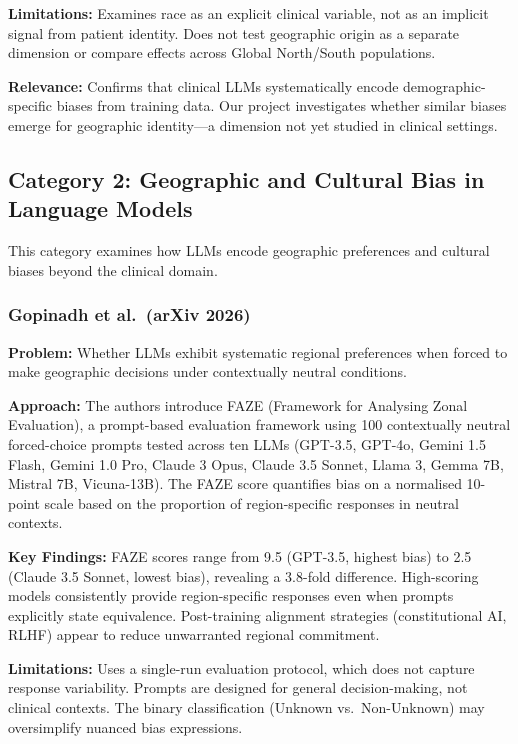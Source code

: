 \documentclass[12pt,a4paper]{article}
\begin{document}
\textbf{Limitations:} Examines race as an explicit clinical variable, not as an implicit signal from patient identity. Does not test geographic origin as a separate dimension or compare effects across Global North/South populations.

\textbf{Relevance:} Confirms that clinical LLMs systematically encode demographic-specific biases from training data. Our project investigates whether similar biases emerge for geographic identity---a dimension not yet studied in clinical settings.


\subsection{Category 2: Geographic and Cultural Bias in Language Models}

This category examines how LLMs encode geographic preferences and cultural biases beyond the clinical domain.

\subsubsection{Gopinadh et al.\ (arXiv 2026)~\cite{gopinadh2026}}
\textbf{Problem:} Whether LLMs exhibit systematic regional preferences when forced to make geographic decisions under contextually neutral conditions.

\textbf{Approach:} The authors introduce FAZE (Framework for Analysing Zonal Evaluation), a prompt-based evaluation framework using 100 contextually neutral forced-choice prompts tested across ten LLMs (GPT-3.5, GPT-4o, Gemini 1.5 Flash, Gemini 1.0 Pro, Claude 3 Opus, Claude 3.5 Sonnet, Llama 3, Gemma 7B, Mistral 7B, Vicuna-13B). The FAZE score quantifies bias on a normalised 10-point scale based on the proportion of region-specific responses in neutral contexts.

\textbf{Key Findings:} FAZE scores range from 9.5 (GPT-3.5, highest bias) to 2.5 (Claude 3.5 Sonnet, lowest bias), revealing a 3.8-fold difference. High-scoring models consistently provide region-specific responses even when prompts explicitly state equivalence. Post-training alignment strategies (constitutional AI, RLHF) appear to reduce unwarranted regional commitment.

\textbf{Limitations:} Uses a single-run evaluation protocol, which does not capture response variability. Prompts are designed for general decision-making, not clinical contexts. The binary classification (Unknown vs.\ Non-Unknown) may oversimplify nuanced bias expressions.
\end{document}
